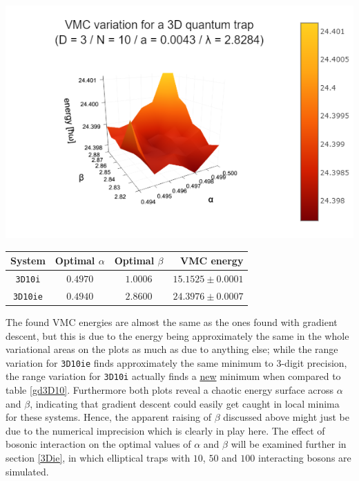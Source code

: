 \documentclass[a4paper,8pt]{article}
\begin{document}
\begin{multicols}{2}
\begin{center}
\includegraphics[width=0.9\columnwidth]{fig3D10ie_variation}
\label{var3D10ie}
\end{center}

\begin{center}\small
{}
\label{r3D10}
\begin{tabular}{cccr}
	\hline\hline
	System & Optimal $\alpha$ & Optimal $\beta$ & VMC energy \\
	\hline
    \texttt{3D10i} & $0.4970$ & $1.0006$ & $15.1525 \pm 0.0001$\\
    \texttt{3D10ie} & $0.4940$ & $2.8600$ & $24.3976 \pm 0.0007$\\
    \hline\hline
\end{tabular}
\end{center}

The found VMC energies are almost the same as the ones found with gradient descent, but this is due to the energy being approximately the same in the whole variational areas on the plots as much as due to anything else; while the range variation for \texttt{3D10ie} finds approximately the same minimum to 3-digit precision, the range variation for \texttt{3D10i} actually finds a \underline{new} minimum when compared to table \ref{gd3D10}. Furthermore both plots reveal a chaotic energy surface across $\alpha$ and $\beta$, indicating that gradient descent could easily get caught in local minima for these systems. Hence, the apparent raising of $\beta$ discussed above might just be due to the numerical imprecision which is clearly in play here. The effect of bosonic interaction on the optimal values of $\alpha$ and $\beta$ will be examined further in section \ref{3Die}, in which elliptical traps with $10$, $50$ and $100$ interacting bosons are simulated.


\end{multicols}
\end{document}
